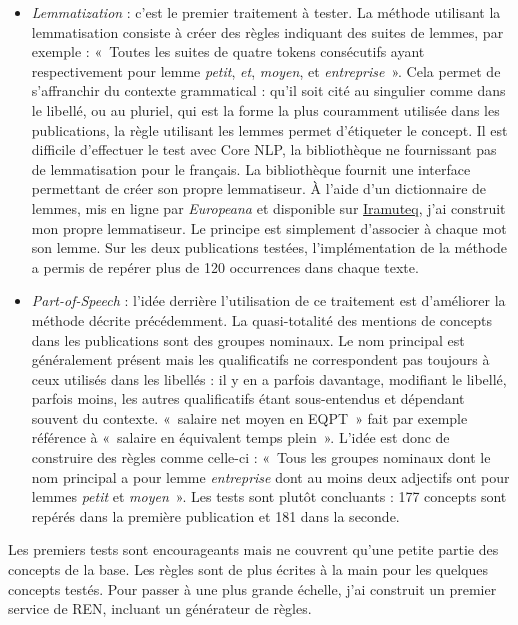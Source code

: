 \begin{itemize}
    \item \textit{Lemmatization} : c'est le premier traitement à tester. La méthode utilisant la lemmatisation consiste à créer des règles indiquant des suites de lemmes, par exemple : «~Toutes les suites de quatre tokens consécutifs ayant respectivement pour lemme \textit{petit}, \textit{et}, \textit{moyen}, et \textit{entreprise}~». Cela permet de s'affranchir du contexte grammatical : qu'il soit cité au singulier comme dans le libellé, ou au pluriel, qui est la forme la plus couramment utilisée dans les publications, la règle utilisant les lemmes permet d'étiqueter le concept. Il est difficile d'effectuer le test avec Core NLP, la bibliothèque ne fournissant pas de lemmatisation pour le français. La bibliothèque fournit une interface permettant de créer son propre lemmatiseur. À l'aide d'un dictionnaire de lemmes, mis en ligne par \textit{Europeana} et disponible sur \href{http://www.iramuteq.org/}{Iramuteq}, j'ai construit mon propre lemmatiseur. Le principe est simplement d'associer à chaque mot son lemme. Sur les deux publications testées, l'implémentation de la méthode a permis de repérer plus de 120 occurrences dans chaque texte.
    \newline
    
    \item \textit{Part-of-Speech} : l'idée derrière l'utilisation de ce traitement est d'améliorer la méthode décrite précédemment. La quasi-totalité des mentions de concepts dans les publications sont des groupes nominaux. Le nom principal est généralement présent mais les qualificatifs ne correspondent pas toujours à ceux utilisés dans les libellés : il y en a parfois davantage, modifiant le libellé, parfois moins, les autres qualificatifs étant sous-entendus et dépendant souvent du contexte. «~salaire net moyen en EQPT~» fait par exemple référence à «~salaire en équivalent temps plein~». L'idée est donc de construire des règles comme celle-ci : «~Tous les groupes nominaux dont le nom principal a pour lemme \textit{entreprise} dont au moins deux adjectifs ont pour lemmes \textit{petit} et \textit{moyen}~». Les tests sont plutôt concluants : 177 concepts sont repérés dans la première publication et 181 dans la seconde.
    \newline
\end{itemize}

Les premiers tests sont encourageants mais ne couvrent qu'une petite partie des concepts de la base. Les règles sont de plus écrites à la main pour les quelques concepts testés. Pour passer à une plus grande échelle, j'ai construit un premier service de REN, incluant un générateur de règles.
\label{section 2.2.4}

